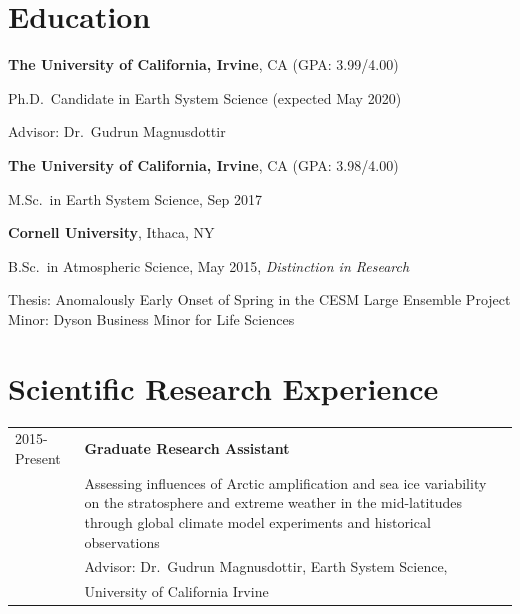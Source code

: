 \documentclass[margin,line,palatino,courier,10pt]{res}
\newenvironment{list1}{
  \begin{list}{\ding{113}}{%
      \setlength{\itemsep}{0in}
      \setlength{\parsep}{0in} \setlength{\parskip}{0in}
      \setlength{\topsep}{0in} \setlength{\partopsep}{0in}
      \setlength{\leftmargin}{0.17in}}}{\end{list}}
\begin{document}
\begin{resume}
\section{\sc \large{\textcolor{Cerulean}{\textbf{Education}}}}

{\bf The University of California, Irvine}, CA (GPA: 3.99/4.00)\\
\vspace*{-.12in}
\begin{list1}
\item[] Ph.D.~Candidate in Earth System Science (expected May 2020)

\hspace*{0.2in} Advisor: Dr.\ Gudrun Magnusdottir
\end{list1}

{\bf The University of California, Irvine}, CA (GPA: 3.98/4.00)\\
\vspace*{-.12in}
\begin{list1}
\item[] M.Sc.~in Earth System Science, Sep 2017
\end{list1}

{\bf Cornell University}, Ithaca, NY\\
\vspace*{-.12in}
\begin{list1}
\item[] B.Sc.~in Atmospheric Science, May 2015, \textit{Distinction in Research}

\hspace{0.2in}  Thesis: Anomalously Early Onset of Spring in the CESM Large Ensemble
\hspace*{0.685in}  Project\\
\hspace*{0.2in}  Minor: Dyson Business Minor for Life Sciences

\end{list1}

\section{\sc \textcolor{Cerulean}{\large{\textbf{Scientific Research Experience}}}}
\vspace*{0.05in}
\begin{tabular}{@{}p{0.9in}p{4in}}
2015-Present & \textbf{Graduate Research Assistant}\\
& Assessing influences of Arctic amplification and sea ice variability on the stratosphere and extreme weather in the mid-latitudes through global climate model experiments and historical observations\\
& \hspace{0.2in} Advisor: Dr.\ Gudrun Magnusdottir, Earth System Science,\\
& \vspace{-0.18in}\hspace{0.2in} University of California Irvine\\


\end{tabular}
\end{resume}
\end{document}
